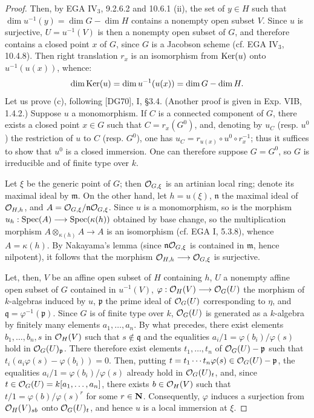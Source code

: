 \begin{proof}
Then, by EGA IV$_3$, 9.2.6.2 and 10.6.1 (ii), the set of $y\in H$ such that $\dim u^{-1}(y)=\dim G-\dim H$ contains a nonempty open subset $V$. Since $u$ is surjective, $U=u^{-1}(V)$ is then a nonempty open subset of $G$, and therefore contains a closed point $x$ of $G$, since $G$ is a Jacobson scheme (cf. EGA IV$_3$, 10.4.8). Then right translation $r_x$ is an isomorphism from $\operatorname{Ker}(u)$ onto $u^{-1}(u(x))$, whence:
\[
\dim\operatorname{Ker}(u)=\dim u^{-1}(u(x))=\dim G-\dim H.
\]
Let us prove (c), following [DG70], I, §3.4. (Another proof is given in Exp. VIB, 1.4.2.) Suppose $u$ a monomorphism. If $C$ is a connected component of $G$, there exists a closed point $x\in G$ such that $C=r_x(G^0)$, and, denoting by $u_C$ (resp. $u^0$) the restriction of $u$ to $C$ (resp. $G^0$), one has $u_C=r_{u(x)}\circ u^0\circ r_x^{-1}$; thus it suffices to show that $u^0$ is a closed immersion. One can therefore suppose $G=G^0$, so $G$ is irreducible and of finite type over $k$.

Let $\xi$ be the generic point of $G$; then $\mathcal{O}_{G,\xi}$ is an artinian local ring; denote its maximal ideal by $\mathfrak m$. On the other hand, let $h=u(\xi)$, $\mathfrak n$ the maximal ideal of $\mathcal{O}_{H,h}$, and $A=\mathcal{O}_{G,\xi}/\mathfrak n\mathcal{O}_{G,\xi}$. Since $u$ is a monomorphism, so is the morphism $u_h:\operatorname{Spec}(A)\longrightarrow\operatorname{Spec}(\kappa(h))$ obtained by base change, so the multiplication morphism $A\otimes_{\kappa(h)}A\to A$ is an isomorphism (cf. EGA I, 5.3.8), whence $A=\kappa(h)$. By Nakayama's lemma (since $\mathfrak n\mathcal{O}_{G,\xi}$ is contained in $\mathfrak m$, hence nilpotent), it follows that the morphism $\mathcal{O}_{H,h}\longrightarrow\mathcal{O}_{G,\xi}$ is surjective.

Let, then, $V$ be an affine open subset of $H$ containing $h$, $U$ a nonempty affine open subset of $G$ contained in $u^{-1}(V)$, $\varphi:\mathcal{O}_H(V)\longrightarrow\mathcal{O}_G(U)$ the morphism of $k$-algebras induced by $u$, $\mathfrak p$ the prime ideal of $\mathcal{O}_G(U)$ corresponding to $\eta$, and $\mathfrak q=\varphi^{-1}(\mathfrak p)$. Since $G$ is of finite type over $k$, $\mathcal{O}_G(U)$ is generated as a $k$-algebra by finitely many elements $a_1,\ldots,a_n$. By what precedes, there exist elements $b_1,\ldots,b_n,s$ in $\mathcal{O}_H(V)$ such that $s\notin\mathfrak q$ and the equalities $a_i/1=\varphi(b_i)/\varphi(s)$ hold in $\mathcal{O}_G(U)_{\mathfrak p}$. There therefore exist elements $t_1,\ldots,t_n$ of $\mathcal{O}_G(U)-\mathfrak p$ such that $t_i(a_i\varphi(s)-\varphi(b_i))=0$. Then, putting $t=t_1\cdots t_n\varphi(s)\in\mathcal{O}_G(U)-\mathfrak p$, the equalities $a_i/1=\varphi(b_i)/\varphi(s)$ already hold in $\mathcal{O}_G(U)_t$, and, since $t\in\mathcal{O}_G(U)=k[a_1,\ldots,a_n]$, there exists $b\in\mathcal{O}_H(V)$ such that $t/1=\varphi(b)/\varphi(s)^r$ for some $r\in\mathbf{N}$. Consequently, $\varphi$ induces a surjection from $\mathcal{O}_H(V)_{sb}$ onto $\mathcal{O}_G(U)_t$, and hence $u$ is a local immersion at $\xi$.


\end{proof}
